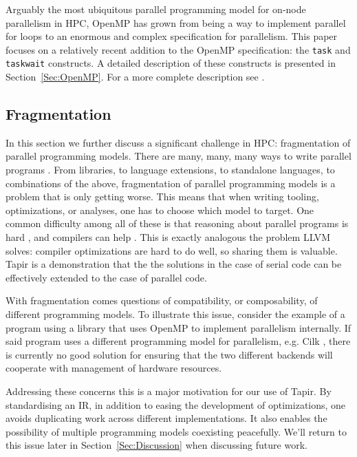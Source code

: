 \documentclass[sigconf]{acmart}
\begin{document}
Arguably the most ubiquitous parallel programming model for on-node parallelism
in HPC, OpenMP has grown from being a way to implement parallel for loops to an
enormous and complex specification for parallelism. This paper focuses on a 
relatively recent addition to the OpenMP specification: the \texttt{task}
and \texttt{taskwait} constructs. A detailed description of these constructs
is presented in Section~\ref{Sec:OpenMP}. For a more complete description see
\cite{spec}.

\subsection{Fragmentation}

In this section we further discuss a significant challenge in HPC:
fragmentation of parallel programming models. There are many, many, many ways
to write parallel programs \cite{....}. From libraries, to language extensions,
to standalone languages, to combinations of the above, fragmentation of
parallel programming models is a problem that is only getting worse. This means
that when writing tooling, optimizations, or analyses, one has to choose which
model to target. One common difficulty among all of these is that reasoning
about parallel programs is hard \cite{}, and compilers can help \cite{}. This
is exactly analogous the problem LLVM solves: compiler optimizations are hard
to do well, so sharing them is valuable. Tapir is a demonstration that the 
the solutions in the case of serial code can be effectively extended to the 
case of parallel code. 

With fragmentation comes questions of compatibility, or composability, of 
different programming models. To illustrate this issue, consider the example of
a program using a library that uses OpenMP to implement parallelism internally. 
If said program uses a different programming model for parallelism, e.g. Cilk
, there is currently no good solution for ensuring that the two different backends
will cooperate with management of hardware resources. 

Addressing these concerns this is a major motivation for our use of Tapir.
By standardising an IR, in addition to easing the development of optimizations,
one avoids duplicating work across different implementations. It also enables
the possibility of multiple programming models coexisting peacefully. We'll
return to this issue later in Section~\ref{Sec:Discussion} when discussing
future work.
\end{document}
